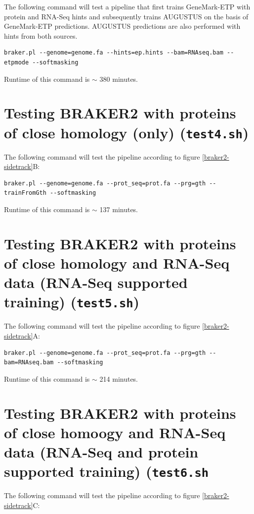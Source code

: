 \documentclass[a4paper,10pt]{report}
\begin{document}
The following command will test a pipeline that first trains GeneMark-ETP with protein and RNA-Seq hints and subsequently trains AUGUSTUS on the basis of GeneMark-ETP predictions. AUGUSTUS predictions are also performed with hints from both sources.

\begin{verbatim}
braker.pl --genome=genome.fa --hints=ep.hints --bam=RNAseq.bam --etpmode --softmasking
\end{verbatim}

Runtime of this command is $\sim$ 380 minutes.

\section{Testing BRAKER2 with proteins of close homology (only) (\texttt{test4.sh})}

The following command will test the pipeline according to figure \ref{braker2-sidetrack}B:

\begin{verbatim}
braker.pl --genome=genome.fa --prot_seq=prot.fa --prg=gth --trainFromGth --softmasking
\end{verbatim}

Runtime of this command is $\sim$ 137 minutes.

\section{Testing BRAKER2 with proteins of close homology and RNA-Seq data (RNA-Seq supported training) (\texttt{test5.sh})}

The following command will test the pipeline according to figure \ref{braker2-sidetrack}A:

\begin{verbatim}
braker.pl --genome=genome.fa --prot_seq=prot.fa --prg=gth --bam=RNAseq.bam --softmasking
\end{verbatim}

Runtime of this command is $\sim$ 214 minutes.

\section{Testing BRAKER2 with proteins of close homoogy and RNA-Seq data (RNA-Seq and protein supported training) (\texttt{test6.sh}}

The following command will test the pipeline according to figure \ref{braker2-sidetrack}C:
\end{document}
